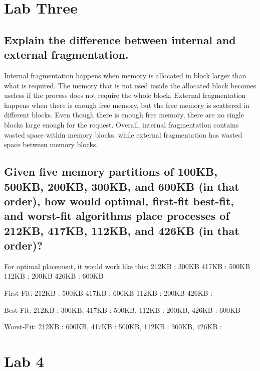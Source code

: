 \documentclass[letterpaper, 10pt,DIV=13]{scrartcl}
\numberwithin{equation}{section} %
\numberwithin{figure}{section} %
\numberwithin{table}{section} %
\begin{document}
\pagebreak
\section{Lab Three}
\subsection{Explain	the	difference	between	internal and external fragmentation.}
Internal fragmentation happens when memory is allocated in block larger than what is required. The memory that is not used inside the allocated block becomes useless if the process does not require the whole block. External fragmentation happens when there is enough free memory, but the free memory is scattered in different blocks. Even though there is enough free memory, there are no single blocks large enough for the request. 
Overall, internal fragmentation contains wasted space within memory blocks, while external fragmentation has wasted space between memory blocks. 
\subsection{Given five memory partitions of 100KB, 500KB, 200KB, 300KB, and 600KB (in that order), how would optimal, first-fit best-fit, and worst-fit algorithms place processes of 212KB, 417KB, 112KB, and 426KB (in that order)?}

For optimal placement, it would work like this: 
212KB : 300KB 
417KB : 500KB 
112KB : 200KB 
426KB : 600KB 

First-Fit: 
212KB : 500KB 
417KB : 600KB 
112KB : 200KB 
426KB : 

Best-Fit: 
212KB : 300KB, 
417KB : 500KB, 
112KB : 200KB, 
426KB : 600KB 

Worst-Fit: 
212KB : 600KB, 
417KB : 500KB, 
112KB : 300KB, 
426KB : 





\pagebreak

\section{Lab 4}
\end{document}
